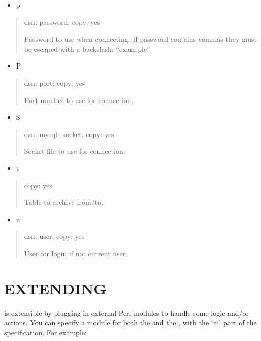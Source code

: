 \documentclass[letterpaper,10pt,english]{sphinxmanual}
\begin{document}
\begin{itemize}
\item {} 
p

\end{itemize}
\begin{quote}

dsn: password; copy: yes

Password to use when connecting.
If password contains commas they must be escaped with a backslash: “exam,ple”
\end{quote}
\begin{itemize}
\item {} 
P

\end{itemize}
\begin{quote}

dsn: port; copy: yes

Port number to use for connection.
\end{quote}
\begin{itemize}
\item {} 
S

\end{itemize}
\begin{quote}

dsn: mysql\_socket; copy: yes

Socket file to use for connection.
\end{quote}
\begin{itemize}
\item {} 
t

\end{itemize}
\begin{quote}

copy: yes

Table to archive from/to.
\end{quote}
\begin{itemize}
\item {} 
u

\end{itemize}
\begin{quote}

dsn: user; copy: yes

User for login if not current user.
\end{quote}


\section{EXTENDING}
\label{\detokenize{mariadb-archiver:extending}}
 is extensible by plugging in external Perl modules to handle some
logic and/or actions.  You can specify a module for both the {\hyperref[\detokenize{mariadb-archiver:cmdoption-mariadb-archiver-source}]{}} and
the {\hyperref[\detokenize{mariadb-archiver:cmdoption-mariadb-archiver-dest}]{}}, with the ‘m’ part of the specification.  For example:
\end{document}
